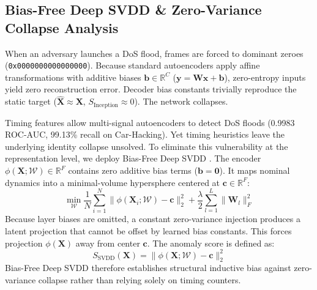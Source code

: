 \documentclass[conference]{IEEEtran}
\begin{document}
\subsection{Bias-Free Deep SVDD \& Zero-Variance Collapse Analysis}
When an adversary launches a DoS flood, frames are forced to dominant zeroes (\texttt{0x0000000000000000}). Because standard autoencoders apply affine transformations with additive biases $\mathbf{b} \in \mathbb{R}^C$ ($\mathbf{y} = \mathbf{W}\mathbf{x} + \mathbf{b}$), zero-entropy inputs yield zero reconstruction error. Decoder bias constants trivially reproduce the static target ($\hat{\mathbf{X}} \approx \mathbf{X}$, $S_{\mathrm{Inception}} \approx 0$). The network collapses.

Timing features allow multi-signal autoencoders to detect DoS floods (0.9983 ROC-AUC, 99.13\% recall on Car-Hacking). Yet timing heuristics leave the underlying identity collapse unsolved. To eliminate this vulnerability at the representation level, we deploy Bias-Free Deep SVDD \cite{ruff2018deepsvdd}. The encoder $\phi(\mathbf{X}; \mathcal{W}) \in \mathbb{R}^F$ contains zero additive bias terms ($\mathbf{b}=\mathbf{0}$). It maps nominal dynamics into a minimal-volume hypersphere centered at $\mathbf{c} \in \mathbb{R}^F$:
\begin{equation}
    \min_{\mathcal{W}} \frac{1}{N} \sum_{i=1}^N \|\phi(\mathbf{X}_i; \mathcal{W}) - \mathbf{c}\|_2^2 + \frac{\lambda}{2} \sum_{l=1}^L \|\mathbf{W}_l\|_F^2
\end{equation}
Because layer biases are omitted, a constant zero-variance injection produces a latent projection that cannot be offset by learned bias constants. This forces projection $\phi(\mathbf{X})$ away from center $\mathbf{c}$. The anomaly score is defined as:
\begin{equation}
    S_{\mathrm{SVDD}}(\mathbf{X}) = \|\phi(\mathbf{X}; \mathcal{W}) - \mathbf{c}\|_2^2
\end{equation}
Bias-Free Deep SVDD therefore establishes structural inductive bias against zero-variance collapse rather than relying solely on timing counters.
\end{document}
